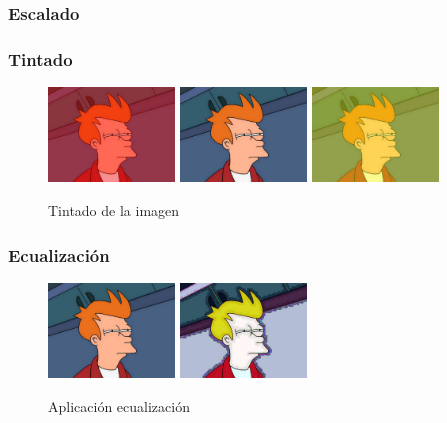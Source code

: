\subsubsection{Escalado}
\subsubsection{Tintado}
\vskip0.3cm
\begin{figure}[H]
 \centering
  \includegraphics[width=0.3\textwidth]{imagenes/fryTinteRojo.jpg}
  \includegraphics[width=0.3\textwidth]{imagenes/Fry.jpg}
  \includegraphics[width=0.3\textwidth]{imagenes/fryTinteAmarillo.jpg}
 \caption{Tintado de la imagen}
 \label{diseño}
\end{figure}
\subsubsection{Ecualización}
\vskip0.3cm
\begin{figure}[H]
 \centering
  \includegraphics[width=0.3\textwidth]{imagenes/Fry.jpg}
  \includegraphics[width=0.3\textwidth]{imagenes/fryEcualizacion.jpg}
 \caption{Aplicación ecualización}
 \label{diseño}
\end{figure}
